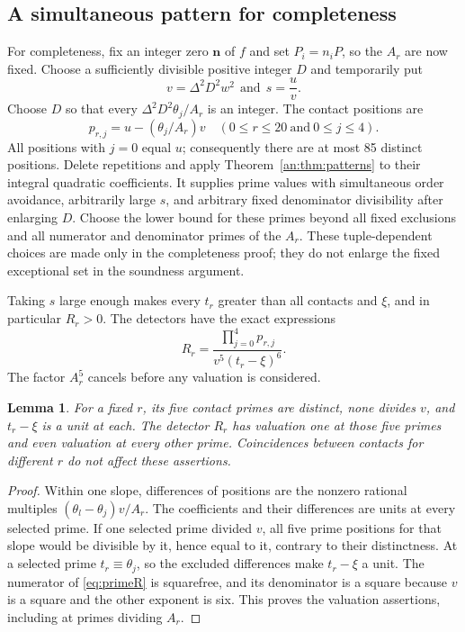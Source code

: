 \documentclass[11pt,reqno]{amsart}
\newtheorem{lemma}[theorem]{Lemma}
\theoremstyle{definition}
\numberwithin{equation}{section}
\def\t{\text}
\def\f{\frac}
\begin{document}
\subsection{A simultaneous pattern for completeness}
For completeness, fix an integer zero $\mathbf n$ of $f$ and set $P_i=n_iP$, so the $A_r$ are now fixed. Choose a sufficiently divisible positive integer $D$ and temporarily put
\begin{equation}\label{eq:twoslopes}
 v=\Delta^2D^2w^2\ \ \t{and}\ \ s=\f uv.
\end{equation}
Choose $D$ so that every $\Delta^2D^2\theta_j/A_r$ is an integer. The contact positions are
\begin{equation}\label{eq:primecontacts}
 p_{r,j}=u-(\theta_j/A_r)v
 \quad(0\le r\le20\ \t{and}\  0\le j\le4).
\end{equation}
All positions with $j=0$ equal $u$; consequently there are at most 85 distinct positions. Delete repetitions and apply Theorem~\ref{an:thm:patterns} to their integral quadratic coefficients. It supplies prime values with simultaneous order avoidance, arbitrarily large $s$, and arbitrary fixed denominator divisibility after enlarging $D$. Choose the lower bound for these primes beyond all fixed exclusions and all numerator and denominator primes of the $A_r$. These tuple-dependent choices are made only in the completeness proof; they do not enlarge the fixed exceptional set in the soundness argument.

Taking $s$ large enough makes every $t_r$ greater than all contacts and $\xi$, and in particular $R_r>0$. The detectors have the exact expressions
\begin{equation}\label{eq:primeR}
 R_r=\frac{\prod_{j=0}^4p_{r,j}}{v^5(t_r-\xi)^6}.
\end{equation}
The factor $A_r^5$ cancels before any valuation is considered.

\begin{lemma}\label{lem:normalization}
For a fixed $r$, its five contact primes are distinct, none divides $v$, and $t_r-\xi$ is a unit at each. The detector $R_r$ has valuation one at those five primes and even valuation at every other prime. Coincidences between contacts for different $r$ do not affect these assertions.
\end{lemma}
\begin{proof}
Within one slope, differences of positions are the nonzero rational multiples $(\theta_l-\theta_j)v/A_r$. The coefficients and their differences are units at every selected prime. If one selected prime divided $v$, all five prime positions for that slope would be divisible by it, hence equal to it, contrary to their distinctness. At a selected prime $t_r\equiv\theta_j$, so the excluded differences make $t_r-\xi$ a unit. The numerator of \eqref{eq:primeR} is squarefree, and its denominator is a square because $v$ is a square and the other exponent is six. This proves the valuation assertions, including at primes dividing $A_r$.
\end{proof}
\end{document}
